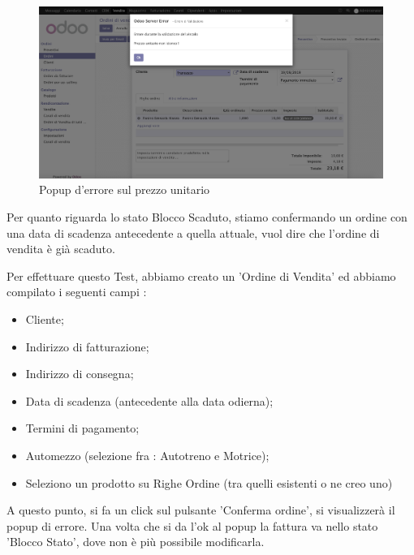\begin{figure}[H]
	\begin{center} \includegraphics[scale=0.3]{figures/error_price}
		\caption[Popup d'errore sul prezzo unitario]{Popup d'errore sul prezzo unitario}
		\label{fig:error_price}
	\end{center}
\end{figure}
Per quanto riguarda lo stato Blocco Scaduto, stiamo confermando un ordine con una data di scadenza antecedente a quella attuale, vuol dire che l'ordine di vendita è già scaduto.

\vspace*{0.5cm}
Per effettuare questo Test, abbiamo creato un 'Ordine di Vendita' ed abbiamo compilato i seguenti campi :

\begin{itemize}
	\item Cliente;
	\item Indirizzo di fatturazione;
	\item Indirizzo di consegna;
	\item Data di scadenza (antecedente alla data odierna);
	\item Termini di pagamento;
	\item Automezzo (selezione fra : Autotreno e Motrice);
	\item Seleziono un prodotto su Righe Ordine (tra quelli esistenti o ne creo uno)
\end{itemize}

A questo punto, si fa un click sul pulsante 'Conferma ordine', si visualizzerà il popup di errore.
Una volta che si da l'ok al popup la fattura va nello stato\\ 'Blocco Stato', dove non è più possibile modificarla.


